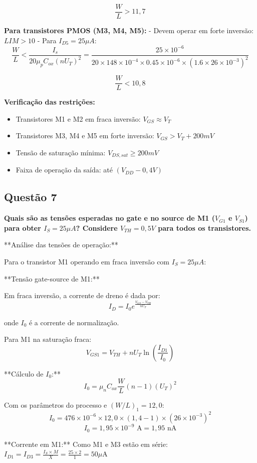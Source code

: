 \documentclass[12pt,a4paper]{article}
\begin{document}
$$\frac{W}{L} > 11,7$$

\textbf{Para transistores PMOS (M3, M4, M5):}
- Devem operar em forte inversão: $LIM > 10$
- Para $I_{D5} = 25\mu A$:
$$\frac{W}{L} < \frac{I_s}{20\mu_p C_{ox} (nU_T)^2} = \frac{25 \times 10^{-6}}{20 \times 148 \times 10^{-4} \times 0.45 \times 10^{-6} \times (1.6 \times 26 \times 10^{-3})^2}$$

$$\frac{W}{L} < 10,8$$

\textbf{Verificação das restrições:}
\begin{itemize}
    \item Transistores M1 e M2 em fraca inversão: $V_{GS} \approx V_T$
    \item Transistores M3, M4 e M5 em forte inversão: $V_{GS} > V_T + 200mV$
    \item Tensão de saturação mínima: $V_{DS,sat} \geq 200mV$
    \item Faixa de operação da saída: até $(V_{DD} - 0,4V)$
\end{itemize}

\subsection*{Questão 7}

\textbf{Quais são as tensões esperadas no gate e no source de M1 ($V_{G1}$ e $V_{S1}$) para obter $I_S = 25 \mu A$? Considere $V_{TH} = 0,5 V$ para todos os transistores.}

**Análise das tensões de operação:**

Para o transistor M1 operando em fraca inversão com $I_S = 25 \mu A$:

**Tensão gate-source de M1:**

Em fraca inversão, a corrente de dreno é dada por:
$$I_D = I_0 e^{\frac{V_{GS} - V_{TH}}{nU_T}} $$

onde $I_0$ é a corrente de normalização.

Para M1 na saturação fraca:
$$V_{GS1} = V_{TH} + nU_T \ln\left(\frac{I_{D1}}{I_0}\right) $$

**Cálculo de $I_0$:**
$$I_0 = \mu_n C_{ox} \frac{W}{L} (n-1)(U_T)^2 $$

Com os parâmetros do processo e $(W/L)_1 = 12,0$:
$$I_0 = 476 \times 10^{-6} \times 12,0 \times (1,4-1) \times (26 \times 10^{-3})^2$$
$$I_0 = 1,95 \times 10^{-9} \text{ A} = 1,95 \text{ nA}$$

**Corrente em M1:**
Como M1 e M3 estão em série: $I_{D1} = I_{D3} = \frac{I_S \times M}{X} = \frac{25 \times 2}{1} = 50 \mu\text{A}$
\end{document}
